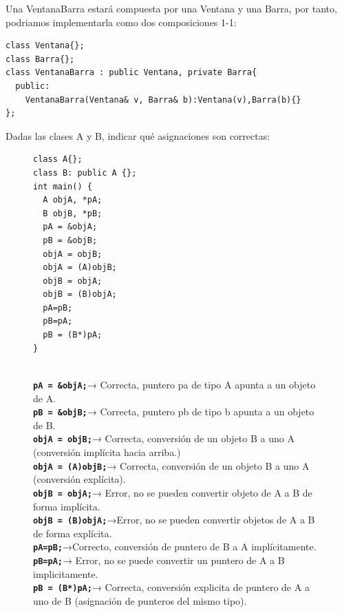 Una VentanaBarra estará compuesta por una Ventana y una Barra, por tanto, podriamos implementarla como dos composiciones 1-1:
\begin{verbatim}
class Ventana{};
class Barra{};
class VentanaBarra : public Ventana, private Barra{
  public:
    VentanaBarra(Ventana& v, Barra& b):Ventana(v),Barra(b){}
};
\end{verbatim}

 Dadas las clases A y B, indicar qué asignaciones son correctas:
\begin{figure}[h]
\begin{minipage}{0.35\textwidth}
\begin{lstlisting}[frame = single]
class A{};
class B: public A {};
int main() {
  A objA, *pA;
  B objB, *pB;
  pA = &objA;
  pB = &objB;
  objA = objB;
  objA = (A)objB;
  objB = objA;
  objB = (B)objA;
  pA=pB;
  pB=pA;
  pB = (B*)pA;
}
\end{lstlisting}
\end{minipage}
\hfill
\begin{minipage}{0.6\textwidth}
\\
\textbf{\texttt{pA = \&objA;}}→ Correcta, puntero pa de tipo A apunta a un objeto de A.\\
\textbf{\texttt{pB = \&objB;}}→ Correcta, puntero pb de tipo b apunta a un objeto de B. \\
\textbf{\texttt{objA = objB;}}→ Correcta, conversión de un objeto B a uno A (conversión implícita hacia arriba.)\\
\textbf{\texttt{objA = (A)objB;}}→ Correcta, conversión de un objeto B a uno A (conversión explícita).\\
\textbf{\texttt{objB = objA;}}→ Error, no se pueden convertir objeto de A a B de forma implícita.\\
\textbf{\texttt{objB = (B)objA;}}→Error, no se pueden convertir objetos de A a B de forma explícita. \\
\textbf{\texttt{pA=pB;}}→Correcto, conversión de puntero de B a A implícitamente.\\
\textbf{\texttt{pB=pA;}}→ Error, no se puede convertir un puntero de A a B implicitamente. \\
\textbf{\texttt{pB = (B*)pA;}}→ Correcta, conversión explicita de puntero de A a uno de B (asignación de punteros del mismo tipo).\\

\end{minipage}
\end{figure}
